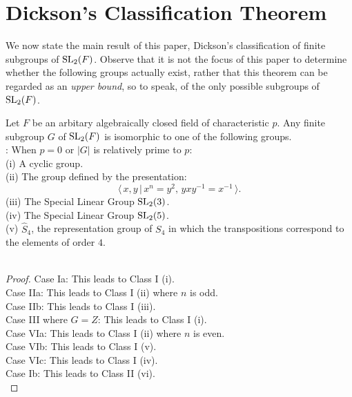 \section{Dickson's Classification Theorem}

We now state the main result of this paper, Dickson's classification of finite subgroups of $\operatorname{SL}_2(F)$. Observe that it is not the focus of this paper to determine whether the following groups actually exist, rather that this theorem can be regarded as an \textit{upper bound}, so to speak, of the only possible subgroups of $\operatorname{SL}_2(F)$.\\

\begin{theorem}[Class I]
    \label{dicksons_classification_theorem_class_I}
     Let $F$ be an arbitary algebraically closed field of characteristic $p$. Any finite subgroup $G$ of $\operatorname{SL}_2(F)$ is isomorphic to one of the following groups. \vspace{3mm} \\
: When $p=0$ or $|G|$ is relatively prime to $p$: \vspace{1mm} \\
(i) A cyclic group. \vspace{3mm} \\
(ii) The group defined by the presentation:
\begin{equation*} \langle \, x,y \, | \, x^n = y^2, \, yxy^{-1} = x^{-1} \, \rangle.
\end{equation*}
(iii) The Special Linear Group $\operatorname{SL}_2(3)$. \vspace{3mm} \\
(iv) The Special Linear Group $\operatorname{SL}_2(5)$. \vspace{3mm} \\
(v) $\widehat{S}_4$, the representation group of $S_4$ in which the transpositions correspond to the elements of order $4$. \\
\\
\end{theorem}
\begin{proof}
    Case Ia: This leads to Class I (i). \\
    Case IIa: This leads to Class I (ii) where $n$ is odd. \\
    Case IIb: This leads to Class I (iii). \\
    Case III where $G=Z$: This leads to Class I (i).\\
    Case VIa: This leads to Class I (ii) where $n$ is even. \\
    Case VIb: This leads to Class I (v). \\
    Case VIc: This leads to Class I (iv). \\
    Case Ib: This leads to Class II (vi). \\
\end{proof}

